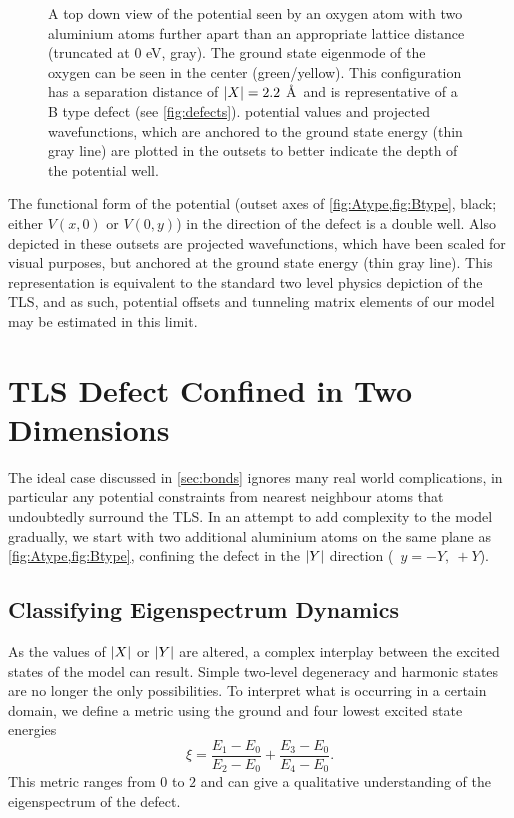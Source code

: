 \begin{figure}[htp]
\resizebox{\textwidth}{!}{}
\caption[B Type Ground State Wavefunction]{\label{fig:Btype}A top down view of the potential seen by an oxygen atom with two aluminium atoms further apart than an appropriate lattice distance (truncated at $0$ eV, gray). The ground state eigenmode of the oxygen can be seen in the center (green/yellow). This configuration has a separation distance of $\lvert X\rvert = 2.2$ \AA\ and is representative of a B type defect (see \cref{fig:defects}).   potential values and projected wavefunctions, which are anchored to the ground state energy (thin gray line) are plotted in the outsets to better indicate the depth of the potential well.}
\end{figure}

The functional form of the  potential (outset axes of \cref{fig:Atype,fig:Btype}, black; either $V(x,0)$ or $V(0,y)$) in the direction of the defect is a double well.
Also depicted in these outsets are projected wavefunctions, which have been scaled for visual purposes, but anchored at the ground state energy (thin gray line).
This representation is equivalent to the standard two level physics depiction of the TLS, and as such, potential offsets and tunneling matrix elements of our model may be estimated in this limit.

\section{TLS Defect Confined in Two Dimensions}\label{sec:2d}

The ideal case discussed in \cref{sec:bonds} ignores many real world complications, in particular any potential constraints from nearest neighbour atoms that undoubtedly surround the TLS.
In an attempt to add complexity to the model gradually, we start with two additional aluminium atoms on the same plane as \cref{fig:Atype,fig:Btype}, confining the defect in the $\lvert Y\rvert$ direction (\ie\ $y = -Y, \: +Y$).

\subsection{Classifying Eigenspectrum Dynamics}

As the values of $\lvert X\rvert$ or $\lvert Y\rvert$ are altered, a complex interplay between the excited states of the model can result.
Simple two-level degeneracy and harmonic states are no longer the only possibilities. To interpret what is occurring in a certain domain, we define a metric using the ground and four lowest excited state energies
\begin{equation}
\xi=\frac{E_{1}-E_{0}}{E_{2}-E_{0}}+\frac{E_{3}-E_{0}}{E_{4}-E_{0}}.
\end{equation}
This metric ranges from $0$ to $2$ and can give a qualitative understanding of the eigenspectrum of the defect.

